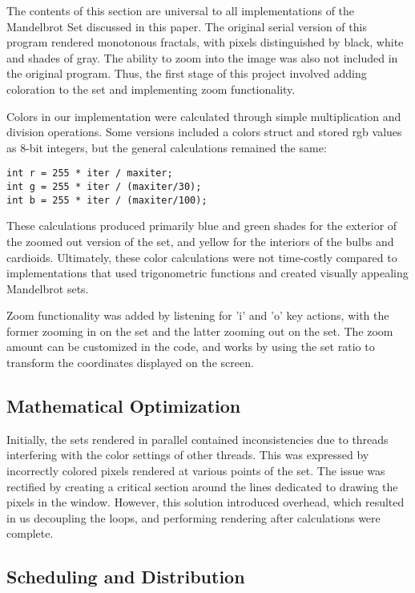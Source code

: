 \documentclass{article}
\begin{document}
The contents of this section are universal to all implementations of the Mandelbrot Set discussed in this paper. The original serial version of this program rendered monotonous fractals, with pixels distinguished by black, white and shades of gray. The ability to zoom into the image was also not included in the original program. Thus, the first stage of this project involved adding coloration to the set and implementing zoom functionality.

Colors in our implementation were calculated through simple multiplication and division operations. Some versions included a colors struct and stored rgb values as 8-bit integers, but the general calculations remained the same:

\begin{verbatim}
int r = 255 * iter / maxiter;
int g = 255 * iter / (maxiter/30);
int b = 255 * iter / (maxiter/100);
\end{verbatim}

These calculations produced primarily blue and green shades for the exterior of the zoomed out version of the set, and yellow for the interiors of the bulbs and cardioids. Ultimately, these color calculations were not time-costly compared to implementations that used trigonometric functions and created visually appealing Mandelbrot sets. 

Zoom functionality was added by listening for 'i' and 'o' key actions, with the former zooming in on the set and the latter zooming out on the set. The zoom amount can be customized in the code, and works by using the set ratio to transform the coordinates displayed on the screen.

\subsection{Mathematical Optimization}

Initially, the sets rendered in parallel contained inconsistencies due to threads interfering with the color settings of other threads. This was expressed by incorrectly colored pixels rendered at various points of the set. The issue was rectified by creating a critical section around the lines dedicated to drawing the pixels in the window. However, this solution introduced overhead, which resulted in us decoupling the loops, and performing rendering after calculations were complete. 



\subsection{Scheduling and Distribution}
\end{document}
